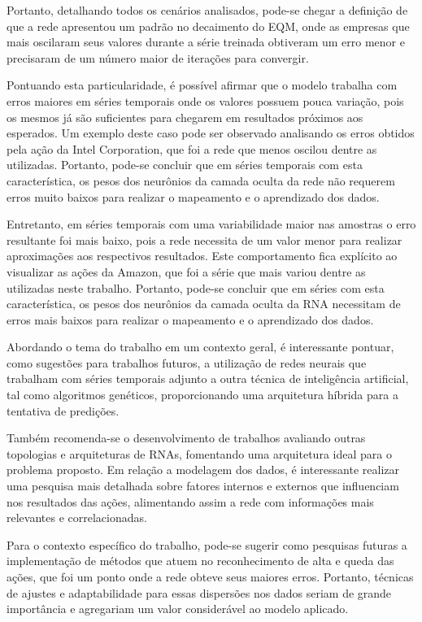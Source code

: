 Portanto, detalhando todos os cenários analisados, pode-se chegar a definição de que a rede apresentou um padrão no decaimento do EQM, onde as empresas que mais oscilaram seus valores durante a série treinada obtiveram um erro menor e precisaram de um número maior de iterações para convergir. 

Pontuando esta particularidade, é possível afirmar que o modelo trabalha com erros maiores em séries temporais onde os valores possuem pouca variação, pois os mesmos já são suficientes para chegarem em resultados próximos aos esperados. Um exemplo deste caso pode ser observado analisando os erros obtidos pela ação da Intel Corporation, que foi a rede que menos oscilou dentre as utilizadas. Portanto, pode-se concluir que em séries temporais com esta característica, os pesos dos neurônios da camada oculta da rede não requerem erros muito baixos para realizar o mapeamento e o aprendizado dos dados. 

Entretanto, em séries temporais com uma variabilidade maior nas amostras o erro resultante foi mais baixo, pois a rede necessita de um valor menor para realizar aproximações aos respectivos resultados. Este comportamento fica explícito ao visualizar as ações da Amazon, que foi a série que mais variou dentre as utilizadas neste trabalho. Portanto, pode-se concluir que em séries com esta característica, os pesos dos neurônios da camada oculta da RNA necessitam de erros mais baixos para realizar o mapeamento e o aprendizado dos dados.

Abordando o tema do trabalho em um contexto geral, é interessante pontuar, como sugestões para trabalhos futuros, a utilização de redes neurais que trabalham com séries temporais adjunto a outra técnica de inteligência artificial, tal como algoritmos genéticos, proporcionando uma arquitetura híbrida para a tentativa de predições. 

Também recomenda-se o desenvolvimento de trabalhos avaliando outras topologias e arquiteturas de RNAs, fomentando uma arquitetura ideal para o problema proposto. Em relação a modelagem dos dados, é interessante realizar uma pesquisa mais detalhada sobre fatores internos e externos que influenciam nos resultados das ações, alimentando assim a rede com informações mais relevantes e correlacionadas.

Para o contexto específico do trabalho, pode-se sugerir como pesquisas futuras a implementação de métodos que atuem no reconhecimento de alta e queda das ações, que foi um ponto onde a rede obteve seus maiores erros. Portanto, técnicas de ajustes e adaptabilidade para essas dispersões nos dados seriam de grande importância e agregariam um valor considerável ao modelo aplicado.